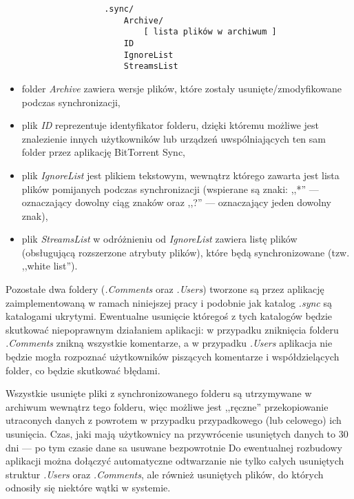 \begin{verbatim}
                    .sync/
                        Archive/
                            [ lista plików w archiwum ]
                        ID
                        IgnoreList
                        StreamsList
\end{verbatim}

\begin{itemize}[noitemsep]
 \item folder \emph{Archive} zawiera wersje plików, które zostały usunięte/zmodyfikowane podczas synchronizacji,
 
 \item plik \emph{ID} reprezentuje identyfikator folderu, dzięki któremu możliwe jest znalezienie innych użytkowników lub urządzeń uwspólniających ten sam folder przez aplikację BitTorrent Sync,
 
 \item plik \emph{IgnoreList} jest plikiem tekstowym, wewnątrz którego zawarta jest lista plików pomijanych podczas synchronizacji (wspierane są znaki: ,,*'' --- oznaczający dowolny ciąg znaków  oraz ,,?'' --- oznaczający jeden dowolny znak),
 
 \item plik \emph{StreamsList} w odróżnieniu od \emph{IgnoreList} zawiera listę plików (obsługującą rozszerzone atrybuty plików), które będą synchronizowane (tzw. ,,white list'').
\end{itemize}


Pozostałe dwa foldery (\emph{.Comments} oraz \emph{.Users}) tworzone są przez aplikację zaimplementowaną w ramach niniejszej pracy i podobnie jak katalog \emph{.sync} są katalogami ukrytymi. Ewentualne usunięcie któregoś z tych katalogów będzie skutkować niepoprawnym działaniem aplikacji: w przypadku zniknięcia folderu \emph{.Comments} znikną wszystkie komentarze, a w przypadku \emph{.Users} aplikacja nie będzie mogła rozpoznać użytkowników piszących komentarze i współdzielących folder, co będzie skutkować błędami.

Wszystkie usunięte pliki z synchronizowanego folderu są utrzymywane w archiwum wewnątrz tego folderu, więc możliwe jest ,,ręczne'' przekopiowanie utraconych danych z powrotem w przypadku przypadkowego (lub celowego) ich usunięcia. Czas, jaki mają użytkownicy na przywrócenie usuniętych danych to 30 dni --- po tym czasie dane sa usuwane bezpowrotnie Do ewentualnej rozbudowy aplikacji można dołączyć automatyczne odtwarzanie nie tylko całych usuniętych struktur \emph{.Users} oraz \emph{.Comments}, ale również usuniętych plików, do których odnosiły się niektóre wątki w systemie.


